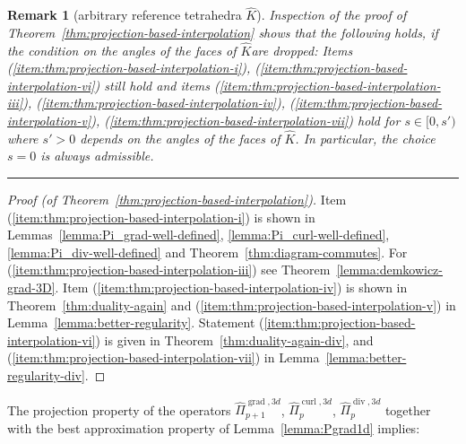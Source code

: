 \documentclass{article}
\newtheorem{remark}[theorem]{Remark}
\newcommand{\hatPicurlcom}{\widehat \Pi^{\operatorname*{curl},3d}_p}
\newcommand{\hatPigradcom}{\widehat\Pi^{\operatorname*{grad},3d}_{p+1}}
\newcommand{\hatPidivcom}{\widehat\Pi^{\operatorname*{div},3d}_{p}}
\newcommand{\eremk}{\hbox{}\hfill\rule{0.8ex}{0.8ex}}
\begin{document}
\begin{remark}[arbitrary reference tetrahedra $\widehat K$]
Inspection of the proof of Theorem~\ref{thm:projection-based-interpolation} shows that 
the following holds, if the condition on the angles 
of the faces of $\widehat K$are dropped:  
Items 
(\ref{item:thm:projection-based-interpolation-i}),
(\ref{item:thm:projection-based-interpolation-vi})
still hold and 
items 
(\ref{item:thm:projection-based-interpolation-iii}), 
(\ref{item:thm:projection-based-interpolation-iv}), 
(\ref{item:thm:projection-based-interpolation-v}), (\ref{item:thm:projection-based-interpolation-vii}) hold for 
$s \in [0, s')$ where $s' > 0$ depends on the angles of the faces of $\widehat K$. 
In particular, the choice $s = 0$ is always admissible. 
\eremk
\end{remark}
%
\begin{proof}[Proof (of Theorem~\ref{thm:projection-based-interpolation})]
Item (\ref{item:thm:projection-based-interpolation-i}) is shown 
in Lemmas~\ref{lemma:Pi_grad-well-defined}, 
          \ref{lemma:Pi_curl-well-defined}, 
         \ref{lemma:Pi_div-well-defined} and Theorem~\ref{thm:diagram-commutes}.
For 
(\ref{item:thm:projection-based-interpolation-iii})
see Theorem~\ref{lemma:demkowicz-grad-3D}.
Item 
(\ref{item:thm:projection-based-interpolation-iv})
is shown in Theorem~\ref{thm:duality-again} and 
(\ref{item:thm:projection-based-interpolation-v}) in 
Lemma~\ref{lemma:better-regularity}.
Statement 
(\ref{item:thm:projection-based-interpolation-vi})
is given in Theorem~\ref{thm:duality-again-div}, and 
(\ref{item:thm:projection-based-interpolation-vii}) in
Lemma~\ref{lemma:better-regularity-div}.
\end{proof}

The projection property of the operators $\hatPigradcom$, $\hatPicurlcom$, $\hatPidivcom$ 
together with the best approximation property of Lemma~\ref{lemma:Pgrad1d} implies:
 
\end{document}
